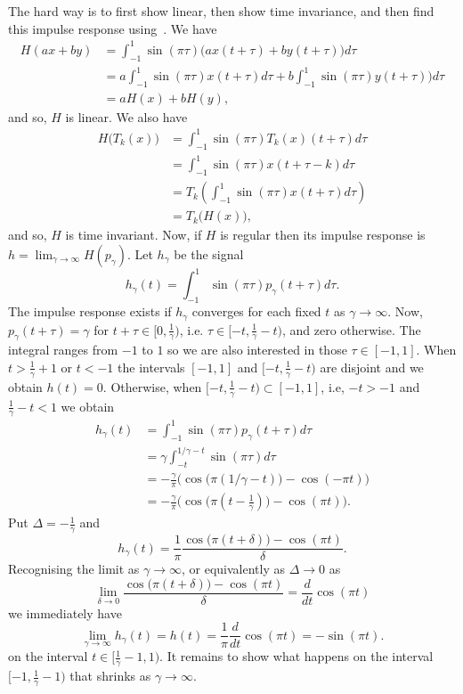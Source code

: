 \begin{excersizelist}
\begin{solution}
The hard way is to first show linear, then show time invariance, and then find this impulse response using~.  We have
\begin{align*}
H(ax+by) &= \int_{-1}^{1} \sin(\pi\tau) \big( ax(t + \tau) + by(t + \tau) \big) d\tau \\
&= a \int_{-1}^{1} \sin(\pi\tau) x(t + \tau) d\tau + b\int_{-1}^{1} \sin(\pi\tau)  y(t + \tau) \big) d\tau \\
&= aH(x) + bH(y),
\end{align*}
and so, $H$ is linear.  We also have
\begin{align*}
H\big(T_k(x)\big) &= \int_{-1}^{1} \sin(\pi\tau) T_k(x)(t + \tau) d\tau \\
&= \int_{-1}^{1} \sin(\pi\tau) x(t + \tau - k) d\tau \\
&= T_k \left( \int_{-1}^{1} \sin(\pi\tau) x(t + \tau) d\tau   \right) \\
&= T_k\big(H(x)\big),
\end{align*}
and so, $H$ is time invariant.  Now, if $H$ is regular then its impulse response is $h = \lim_{\gamma \rightarrow \infty} H(p_\gamma)$.  Let $h_\gamma$ be the signal
\[
h_\gamma(t) = \int_{-1}^{1} \sin(\pi\tau) p_\gamma(t + \tau) d\tau.
\]
The impulse response exists if $h_\gamma$ converges for each fixed $t$ as $\gamma \to \infty$.  %
Now, $p_\gamma(t+\tau) = \gamma$ for $t + \tau \in [0, \tfrac{1}{\gamma})$, i.e. $\tau \in [-t, \tfrac{1}{\gamma}-t)$, and zero otherwise.  The integral ranges from $-1$ to $1$ so we are also interested in those $\tau \in [-1,1]$.  When $t > \tfrac{1}{\gamma} +1$ or $t < -1$ the intervals $[-1,1]$ and  $[-t, \tfrac{1}{\gamma}-t)$ are disjoint and we obtain $h(t) = 0$.  Otherwise, when $[-t, \tfrac{1}{\gamma} - t) \subset [-1,1]$, i.e, $-t > -1$ and $\tfrac{1}{\gamma} - t < 1$ we obtain
\begin{align*}
h_\gamma(t) &= \int_{-1}^{1} \sin(\pi\tau) p_\gamma(t + \tau) d\tau \\
&= \gamma \int_{-t}^{1/\gamma - t} \sin(\pi\tau) d\tau \\
&= - \frac{\gamma}{\pi} \big( \cos\big(\pi(1/\gamma - t)\big) - \cos(-\pi t) \big) \\
&= - \frac{\gamma}{\pi} \big( \cos\big(\pi(t - \tfrac{1}{\gamma})\big) - \cos(\pi t) \big).
\end{align*}
Put $\Delta = -\tfrac{1}{\gamma}$ and 
\[
h_\gamma(t) = \frac{1}{\pi} \frac{ \cos\big(\pi(t + \delta)\big) - \cos(\pi t) }{\delta}.
\]
Recognising the limit as $\gamma \to \infty$, or equivalently as $\Delta \to 0$ as
\[
\lim_{\delta \to 0} \frac{ \cos\big(\pi(t + \delta)\big) - \cos(\pi t) }{\delta} = \frac{d}{dt} \cos(\pi t)
\]
we immediately have
\[
\lim_{\gamma \to \infty} h_\gamma(t) = h(t) =\frac{1}{\pi} \frac{d}{dt} \cos(\pi t) = -\sin(\pi t).
\]
on the interval $t \in [\tfrac{1}{\gamma}-1 ,1)$.  It remains to show what happens on the interval $[-1, \tfrac{1}{\gamma}-1)$ that shrinks as $\gamma \to \infty$.


\end{solution}
\end{excersizelist}
